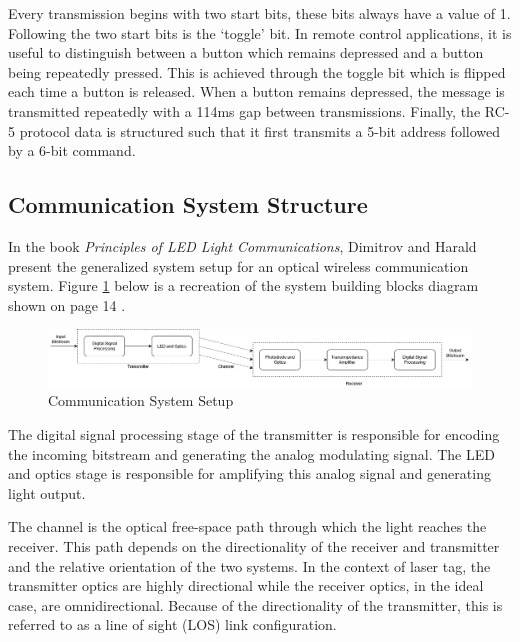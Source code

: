 Every transmission begins with two start bits, these bits always have a value of 1. Following the two start bits is the `toggle' bit. In remote control applications, it is useful to distinguish between a button which remains depressed and a button being repeatedly pressed. This is achieved through the toggle bit which is flipped each time a button is released. When a button remains depressed, the message is transmitted repeatedly with a 114ms gap between transmissions. Finally, the RC-5 protocol data is structured such that it first transmits a 5-bit address followed by a 6-bit command.




\subsection{Communication System Structure} 

In the book \textit{Principles of LED Light Communications}, Dimitrov and Harald present the generalized system setup for an optical wireless communication system. Figure \ref{fig:system_configuartion_lit} below is a recreation of the system building blocks diagram shown on page 14 \cite{Dimitrov2015}.

\begin{figure}[H]
	\centering
	\includegraphics[width=\linewidth]{figures/litreview/system_configuartion_lit.png}
	\caption{Communication System Setup}
	\label{fig:system_configuartion_lit}
\end{figure}

The digital signal processing stage of the transmitter is responsible for encoding the incoming bitstream and generating the analog modulating signal. The LED and optics stage is responsible for amplifying this analog signal and generating light output.

The channel is the optical free-space path through which the light reaches the receiver. This path depends on the directionality of the receiver and transmitter and the relative orientation of the two systems. In the context of laser tag, the transmitter optics are highly directional while the receiver optics, in the ideal case, are omnidirectional. Because of the directionality of the transmitter, this is referred to as a line of sight (LOS) link configuration.

